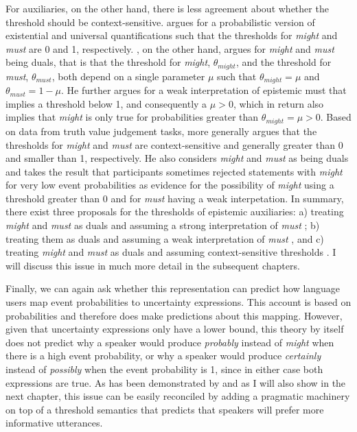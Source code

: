 For auxiliaries, on the other hand, there is less agreement about whether the threshold should be context-sensitive. \cite{Yalcin2010} argues
for a probabilistic version of existential and universal quantifications such that the thresholds for \textit{might} and \textit{must} are 0 and 1, respectively.
\cite{Swanson2006}, on the other hand,  argues for \textit{might} and \textit{must} being duals, that is that the threshold for \textit{might}, $\theta_{might}$, 
and the threshold for \textit{must}, $\theta_{must}$, both depend on a single parameter $\mu$ such that  $\theta_{might} = \mu$ and  $\theta_{must} = 1 - \mu$. 
He further argues for a weak interpretation of epistemic must that implies a threshold below 1, and consequently a $\mu > 0$, which in return also implies
that  \textit{might} is only true for probabilities greater than $\theta_{might} = \mu > 0$. Based on data from truth value judgement tasks, \cite{Lassiter2017} 
more generally argues that the thresholds for \textit{might} and \textit{must} are context-sensitive and generally greater than 0 and smaller than 1, respectively. 
He also considers \textit{might} and \textit{must} as being duals and takes the result that participants sometimes rejected statements with \textit{might} for very low
event probabilities as evidence for the possibility of \textit{might} using a threshold greater than 0 and for \textit{must} having a weak interpetation.
In summary, there exist three proposals for the thresholds of epistemic auxiliaries: a) treating \textit{might} and \textit{must} as duals and assuming a strong interpretation
of \textit{must} \cite{Yalcin2010}; b) treating them as duals and assuming a weak interpretation of \textit{must} \cite{Swanson2006}, and c) treating \textit{might} and
\textit{must} as duals and assuming context-sensitive thresholds \cite{Lassiter2017}. I will discuss this issue in much more detail in the subsequent chapters.

Finally, we can again ask whether this representation can predict how language users map event probabilities to uncertainty expressions.
This account is based on probabilities and therefore does make predictions about this mapping. However, given that uncertainty expressions
only have a lower bound, this theory by itself does not predict why a speaker would produce \textit{probably} instead of \textit{might} when there is
a high event probability, or why a speaker would produce \textit{certainly} instead of \textit{possibly} when the event probability is 1, since
in either case both expressions are true. As has been demonstrated by \cite{HerbstrittandFranke2019} and as I will also show in the next chapter, this
issue can be easily reconciled by adding a pragmatic machinery on top of a threshold semantics that predicts that speakers will prefer more informative
utterances. 

